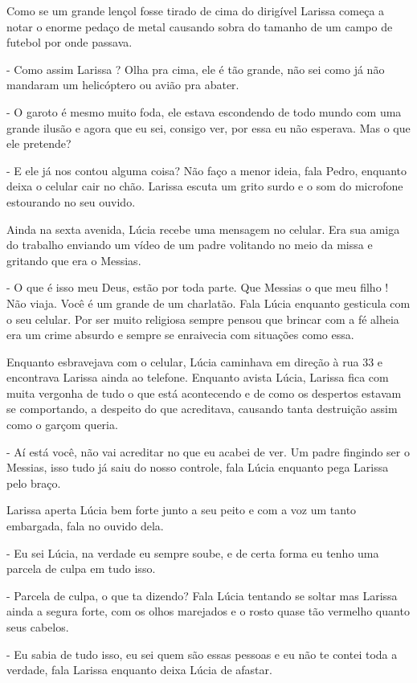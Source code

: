 Como se um grande lençol fosse tirado de cima do dirigível Larissa começa a notar o enorme pedaço de metal causando sobra do tamanho de um campo de futebol por onde passava.

- Como assim Larissa ? Olha pra cima, ele é tão grande, não sei como já não mandaram um helicóptero ou avião pra abater.

- O garoto é mesmo muito foda, ele estava escondendo de todo mundo com uma grande ilusão e agora que eu sei, consigo ver, por essa eu não esperava. Mas o que ele pretende?

- E ele já nos contou alguma coisa? Não faço a menor ideia, fala Pedro, enquanto deixa o celular cair no chão. Larissa escuta um grito surdo e o som do microfone estourando no seu ouvido.

Ainda na sexta avenida, Lúcia recebe uma mensagem no celular. Era sua amiga do trabalho enviando um vídeo de um padre volitando no meio da missa e gritando que era o Messias.

- O que é isso meu Deus, estão por toda parte. Que Messias o que meu filho ! Não viaja. Você é um grande de um charlatão. Fala Lúcia enquanto gesticula com o seu celular. Por ser muito religiosa sempre pensou que brincar com a fé alheia era um crime absurdo e sempre se enraivecia com situações como essa.

Enquanto esbravejava com o celular, Lúcia caminhava em direção à rua 33 e encontrava Larissa ainda ao telefone. Enquanto avista Lúcia, Larissa fica com muita vergonha de tudo o que está acontecendo e de como os despertos estavam se comportando, a despeito do que acreditava, causando tanta destruição assim como o garçom queria.

- Aí está você, não vai acreditar no que eu acabei de ver. Um padre fingindo ser o Messias, isso tudo já saiu do nosso controle, fala Lúcia enquanto pega Larissa pelo braço.

Larissa aperta Lúcia bem forte junto a seu peito e com a voz  um tanto embargada, fala no ouvido dela.

- Eu sei Lúcia, na verdade eu sempre soube, e de certa forma eu tenho uma parcela de culpa em tudo isso.

- Parcela de culpa, o que ta dizendo? Fala Lúcia tentando se soltar mas Larissa ainda a segura forte, com os olhos marejados e o rosto quase tão vermelho quanto seus cabelos.

- Eu sabia de tudo isso, eu sei quem são essas pessoas e eu não te contei toda a verdade, fala Larissa enquanto deixa Lúcia de afastar.

